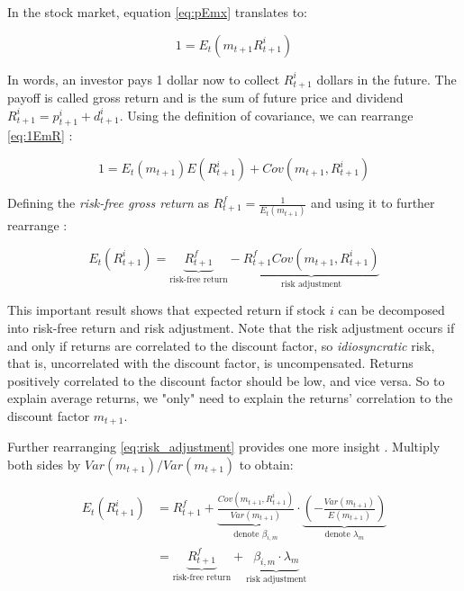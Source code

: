 	 	In the stock market, equation \ref{eq:pEmx} translates to:
	 	
	 	\begin{equation}
	 		1 = E_t(m_{t+1} R_{t+1}^i ) \label{eq:1EmR}
	 	\end{equation} 
	 	
	 	In words, an investor pays 1 dollar now to collect $R_{t+1}^i$ dollars in the future. The payoff is called gross return and is the sum of future price and dividend $R_{t+1}^i = p_{t+1}^i+ d_{t+1}^i$. 
	 	Using the definition of covariance, we can rearrange \ref{eq:1EmR} \citep{cochrane2009asset}:
	 	
	 	\begin{equation}
	 		1 = E_t(m_{t+1}) E(R_{t+1}^i) + Cov(m_{t+1},R_{t+1}^i) 
	 	\end{equation} 
 	
 		Defining the \textit{risk-free gross return} as $R_{t+1}^f=\frac{1}{E_t(m_{t+1})}$ and using it to further rearrange \citep{cochrane2009asset}:
 		
 		\begin{equation}
 			E_t(R_{t+1}^i) = \underbrace{R_{t+1}^f}_\text{risk-free return}  -  \underbrace{R_{t+1}^f Cov(m_{t+1},R_{t+1}^i)}_\text{risk adjustment} \label{eq:risk_adjustment}
 		\end{equation} 
 		
 		This important result shows that expected return if stock $i$ can be decomposed into risk-free return and risk adjustment. Note that the risk adjustment occurs if and only if returns are correlated to the discount factor, so \textit{idiosyncratic} risk, that is, uncorrelated with the discount factor, is uncompensated. Returns positively correlated to the discount factor should be low, and vice versa. So to explain average returns, we "only" need to explain the returns' correlation to the discount factor $m_{t+1}$. 
 		
 		Further rearranging \ref{eq:risk_adjustment} provides one more insight \citep{cochrane2009asset}. Multiply both sides by $Var(m_{t+1})/Var(m_{t+1})$ to obtain:
 		
 		\begin{align}
	 		E_t(R_{t+1}^i) 
	 		& = {R_{t+1}^f} + 
	 		\underbrace{
	 			\frac{Cov(m_{t+1},R_{t+1}^i)}{Var(m_{t+1})}
	 			}_\text{denote $\beta_{i,m}$} 
 			\cdot 
 			\underbrace{
 				\left(-\frac{Var(m_{t+1})}{E(m_{t+1})}\right)
 				}_\text{denote $\lambda_m$} \label{eq:factor_model} \\
 			& = \underbrace{{R_{t+1}^f}
 				}_\text{risk-free return} 
 				+ 
 				\underbrace{\beta_{i,m} \cdot \lambda_m
 				}_\text{risk adjustment} \label{eq:beta_reprezentation}
 		\end{align} 
 		
